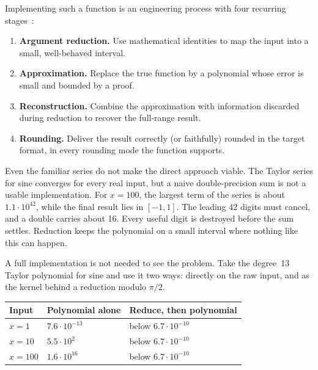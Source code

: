 \documentclass[manuscript, nonacm]{acmart}
\begin{document}
  Implementing such a function is an engineering process with four recurring
  stages~\cite{muller,handbook}:

  \begin{enumerate}
    \item \textbf{Argument reduction.}  Use mathematical identities to map
    the input into a small, well-behaved interval.
    \item \textbf{Approximation.}  Replace the true function by a polynomial
    whose error is small and bounded by a proof.
    \item \textbf{Reconstruction.}  Combine the approximation with information
    discarded during reduction to recover the full-range result.
    \item \textbf{Rounding.}  Deliver the result correctly (or faithfully)
    rounded in the target format, in every rounding mode the function supports.
  \end{enumerate}

  Even the familiar series do not make the direct approach viable. The Taylor
  series for sine converges for every real input, but a naive double-precision
  sum is not a usable implementation. For $x = 100$, the largest term of the
  series is about $1.1 \cdot 10^{42}$, while the final result lies in
  $[-1, 1]$. The leading 42 digits must cancel, and a double carries about
  16. Every useful digit is destroyed before the sum settles. Reduction
  keeps the polynomial on a small interval where nothing like this can
  happen.

  A full implementation is not needed to see the problem. Take the degree~13
  Taylor polynomial for sine and use it two ways: directly on the raw input,
  and as the kernel behind a reduction modulo $\pi/2$.

  \begin{table}[tbp]
    \centering
    \begin{tabular}{lll}
      \toprule
      Input     & Polynomial alone     & Reduce, then polynomial    \\
      \midrule
      $x = 1$   & $7.6 \cdot 10^{-13}$ & below $6.7 \cdot 10^{-10}$ \\
      $x = 10$  & $5.5 \cdot 10^{2}$   & below $6.7 \cdot 10^{-10}$ \\
      $x = 100$ & $1.6 \cdot 10^{16}$  & below $6.7 \cdot 10^{-10}$ \\
      \bottomrule
    \end{tabular}
  \end{table}
\end{document}
